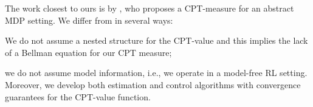 The work closest to ours is by \citet{lin2013stochastic}, who proposes a CPT-measure for an abstract MDP setting.
 We differ from \cite{lin2013stochastic} in several ways:
\begin{inparaenum}[\it (i)]
\item We do not assume a nested structure for the CPT-value %
and this implies the lack of a Bellman equation for our CPT measure;
\item we do not assume model information, i.e., we operate in a model-free RL setting. Moreover, we develop both estimation and control algorithms with convergence guarantees for the CPT-value function.
\end{inparaenum}


